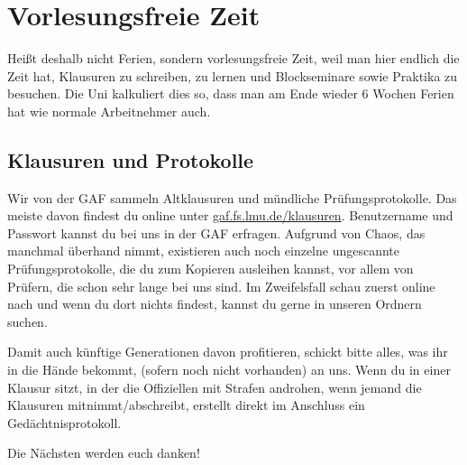 ﻿
\chapter{Vorlesungsfreie Zeit}

Heißt deshalb nicht Ferien, sondern vorlesungsfreie Zeit, weil man hier endlich die Zeit hat, Klausuren zu schreiben, zu lernen und Blockseminare sowie Praktika zu besuchen. Die Uni kalkuliert dies so, dass man am Ende wieder 6 Wochen Ferien hat wie normale Arbeitnehmer auch.

\section{Klausuren und Protokolle}
Wir von der GAF sammeln Altklausuren und mündliche Prüfungsprotokolle. Das meiste davon findest du online unter \url{gaf.fs.lmu.de/klausuren}. Benutzername und Passwort kannst du bei uns in der GAF erfragen. Aufgrund von Chaos, das manchmal überhand nimmt, existieren auch noch einzelne ungescannte Prüfungsprotokolle, die du zum Kopieren ausleihen kannst, vor allem von Prüfern, die schon sehr lange bei uns sind. Im Zweifelsfall schau zuerst online nach und wenn du dort nichts findest, kannst du gerne in unseren Ordnern suchen.

Damit auch künftige Generationen davon profitieren, schickt bitte alles,
was ihr in die Hände bekommt, (sofern noch nicht vorhanden) an uns.
Wenn du in einer Klausur sitzt, in der die Offiziellen mit Strafen
androhen, wenn jemand die Klausuren mitnimmt/abschreibt, erstellt
direkt im Anschluss ein Gedächtnisprotokoll.

Die Nächsten werden euch danken!

